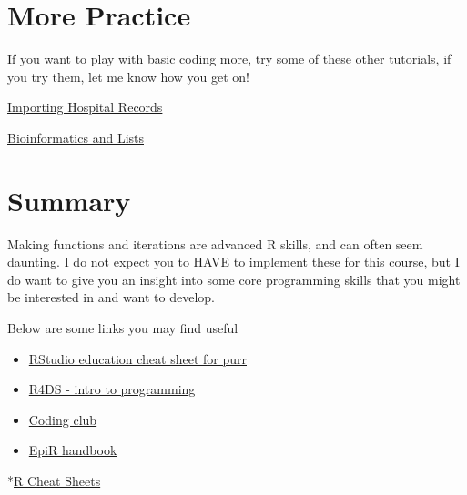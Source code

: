 \documentclass[
]{book}
\begin{document}
\hypertarget{more-practice}{%
\section{More Practice}\label{more-practice}}

If you want to play with basic coding more, try some of these other tutorials, if you try them, let me know how you get on!

\href{https://www.gerkelab.com/blog/2018/09/import-directory-csv-purrr-readr/}{Importing Hospital Records}

\href{https://sanderwuyts.com/en/blog/purrr-tutorial/}{Bioinformatics and Lists}

\hypertarget{summary-1}{%
\section{Summary}\label{summary-1}}

Making functions and iterations are advanced R skills, and can often seem daunting. I do not expect you to HAVE to implement these for this course, but I do want to give you an insight into some core programming skills that you might be interested in and want to develop.

Below are some links you may find useful

\begin{itemize}
\item
  \href{https://www.rstudio.com/resources/cheatsheets/}{RStudio education cheat sheet for purr}
\item
  \href{https://r4ds.had.co.nz/program-intro.html}{R4DS - intro to programming}
\item
  \href{https://ourcodingclub.github.io/tutorials/funandloops/\#function}{Coding club}
\item
  \href{https://epirhandbook.com/en/iteration-loops-and-lists.html}{EpiR handbook}
\end{itemize}

*\href{https://www.rstudio.com/resources/cheatsheets/}{R Cheat Sheets}

  
\end{document}

